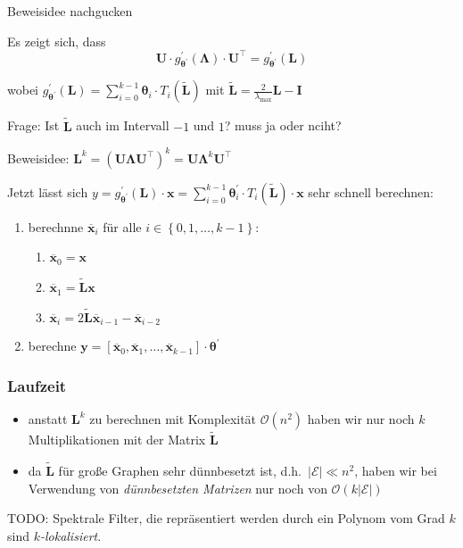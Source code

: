 Beweisidee nachgucken

Es zeigt sich, dass
\begin{equation}
  \mathbf{U} \cdot g^{\prime}_{\mathbf{\theta}^{\prime}}\left(\mathbf{\Lambda}\right) \cdot \mathbf{U}^{\top} = g^{\prime}_{\mathbf{\theta}^{\prime}}\left(\mathbf{L}\right)
\end{equation}

wobei $g^{\prime}_{\mathbf{\theta}^{\prime}}\left(\mathbf{L}\right) = \sum_{i=0}^{k-1} \mathbf{\theta}_i \cdot T_i\left(\mathbf{\tilde L}\right)$ mit $\mathbf{\tilde L} = \frac{2}{\lambda_{\max}}\mathbf{L} - \mathbf{I}$

Frage:
Ist $\mathbf{\tilde L}$ auch im Intervall $-1$ und $1$?
muss ja oder nciht?

Beweisidee: $\mathbf{L}^k = {\left(\mathbf{U}\mathbf{\Lambda}\mathbf{U}^{\top}\right)}^k = \mathbf{U}\mathbf{\Lambda}^k\mathbf{U^{\top}}$

Jetzt lässt sich $y = g^{\prime}_{\mathbf{\theta^{\prime}}}\left(\mathbf{L}\right) \cdot \mathbf{x} = \sum_{i=0}^{k-1} \mathbf{\theta}^{\prime}_i \cdot T_i \left(\mathbf{\tilde L}\right) \cdot \mathbf{x}$ sehr schnell berechnen:

\begin{enumerate}
  \item berechnne $\mathbf{\overline{x}}_i$ für alle $i \in \left\{ 0, 1, \ldots, k-1 \right\}$:
  \begin{enumerate}
    \item $\mathbf{\overline{x}}_0 = \mathbf{x}$
    \item $\mathbf{\overline{x}}_1 = \mathbf{\tilde L} \mathbf{x}$
    \item $\mathbf{\overline{x}}_i = 2\mathbf{\tilde L} \mathbf{\overline{x}}_{i-1} - \mathbf{\overline{x}}_{i-2}$
  \end{enumerate}
\item berechne $\mathbf{y} = \left[\mathbf{\overline{x}}_0, \mathbf{\overline{x}}_1, \ldots, \mathbf{\overline{x}}_{k-1} \right] \cdot \mathbf{\theta}^{\prime}$
\end{enumerate}

\subsubsection{Laufzeit}

 \begin{itemize}
   \item anstatt $\mathbf{L}^k$ zu berechnen mit Komplexität $\mathcal{O}\left(n^2\right)$ haben wir nur noch $k$ Multiplikationen mit der Matrix $\mathbf{\tilde L}$
   \item da $\mathbf{\tilde L}$ für große Graphen sehr dünnbesetzt ist, d.h.\ $\left|\mathcal{E}\right| \ll n^2$, haben wir bei Verwendung von \emph{dünnbesetzten Matrizen} nur noch von $\mathcal{O}\left(k\left|\mathcal{E}\right|\right)$ 
 \end{itemize}

TODO:
Spektrale Filter, die repräsentiert werden durch ein Polynom vom Grad $k$ sind \emph{$k$-lokalisiert}.
